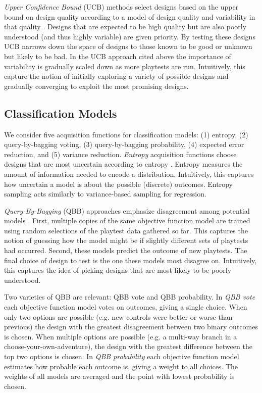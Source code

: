 \documentclass{sig-alternate}
\begin{document}
\textit{Upper Confidence Bound} (UCB) methods select designs based on the upper bound on design quality according to a model of design quality and variability in that quality \cite{srinivas2010:gp-ucb}.
Designs that are expected to be high quality but are also poorly understood (and thus highly variable) are given priority.
By testing these designs UCB narrows down the space of designs to those known to be good or unknown but likely to be bad.
In the UCB approach cited above the importance of variability is gradually scaled down as more playtests are run.
Intuitively, this capture the notion of initially exploring a variety of possible designs and gradually converging to exploit the most promising designs.



\subsection{Classification Models}
We consider five acquisition functions for classification models: (1) entropy, (2) query-by-bagging voting, (3) query-by-bagging probability, (4) expected error reduction, and (5) variance reduction.
\textit{Entropy} acquisition functions choose designs that are most uncertain according to entropy \cite{settles2012:al-book}.
Entropy measures the amount of information needed to encode a distribution.
Intuitively, this captures how uncertain a model is about the possible (discrete) outcomes.
Entropy sampling acts similarly to variance-based sampling for regression.


\textit{Query-By-Bagging} (QBB) approaches emphasize disagreement among potential models \cite{settles2012:al-book}.
First, multiple copies of the same objective function model are trained using random selections of the playtest data gathered so far.
This captures the notion of guessing how the model might be if slightly different sets of playtests had occurred.
Second, these models predict the outcome of new playtests.
The final choice of design to test is the one these models most disagree on.
Intuitively, this captures the idea of picking designs that are most likely to be poorly understood.

Two varieties of QBB are relevant: QBB vote and QBB probability.
In \textit{QBB vote} each objective function model votes on outcomes, giving a single choice.
When only two options are possible (e.g. new controls were better or worse than previous) the design with the greatest disagreement between two binary outcomes is chosen.
When multiple options are possible (e.g. a multi-way branch in a choose-your-own-adventure), the design with the greatest difference between the top two options is chosen.
%
In \textit{QBB probability} each objective function model estimates how probable each outcome is, giving a weight to all choices.
The weights of all models are averaged and the point with lowest probability is chosen. 
\end{document}
